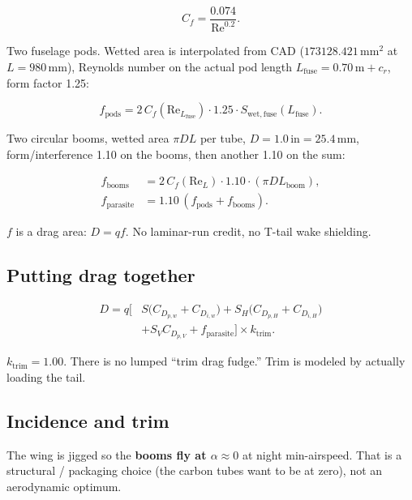 \documentclass[11pt,letterpaper]{article}
\begin{document}
\begin{equation}
  C_f = \frac{0.074}{\mathrm{Re}^{0.2}}.
\end{equation}

Two fuselage pods. Wetted area is interpolated from CAD ($173128.421\,\mathrm{mm}^2$ at $L=980\,\mathrm{mm}$), Reynolds number on the actual pod length $L_\mathrm{fuse} = 0.70\,\mathrm{m}+c_r$, form factor 1.25:

\begin{equation}
  f_\mathrm{pods} = 2\, C_f(\mathrm{Re}_{L_\mathrm{fuse}}) \cdot 1.25 \cdot S_{\mathrm{wet,fuse}}(L_\mathrm{fuse}).
\end{equation}

Two circular booms, wetted area $\pi D L$ per tube, $D = 1.0\,\mathrm{in} = 25.4\,\mathrm{mm}$, form/interference 1.10 on the booms, then another 1.10 on the sum:

\begin{align}
  f_\mathrm{booms} &= 2\, C_f(\mathrm{Re}_L) \cdot 1.10 \cdot (\pi D L_\mathrm{boom}), \\
  f_\mathrm{parasite} &= 1.10\,(f_\mathrm{pods} + f_\mathrm{booms}).
\end{align}

$f$ is a drag area: $D = q f$. No laminar-run credit, no T-tail wake shielding.

\subsection{Putting drag together}

\begin{equation}
\begin{aligned}
  D = q \Big[&
      S \bigl(C_{D_{p,w}} + C_{D_{i,w}}\bigr)
    + S_H \bigl(C_{D_{p,H}} + C_{D_{i,H}}\bigr) \\
    &+ S_V C_{D_{p,V}}
    + f_\mathrm{parasite}
  \Bigr] \times k_\mathrm{trim}.
\end{aligned}
\label{eq:drag}
\end{equation}

$k_\mathrm{trim} = 1.00$. There is no lumped ``trim drag fudge.'' Trim is modeled by actually loading the tail.

\subsection{Incidence and trim}
\label{sec:trim}

The wing is jigged so the \textbf{booms fly at $\alpha \approx 0$} at night min-airspeed. That is a structural / packaging choice (the carbon tubes want to be at zero), not an aerodynamic optimum.
\end{document}
